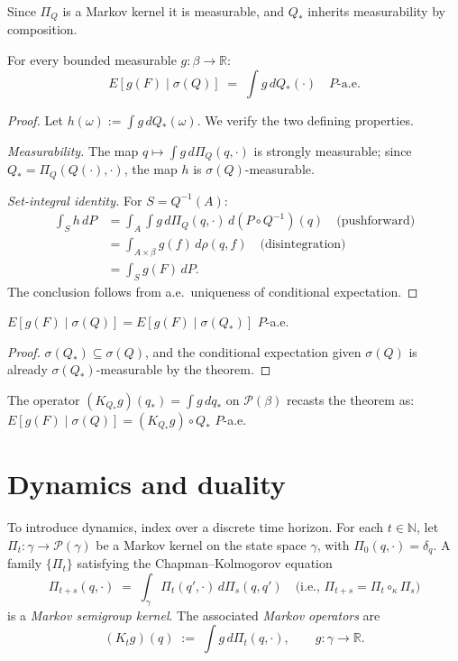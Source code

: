 Since $\Pi_Q$ is a Markov kernel it is measurable, and $Q_*$ inherits
measurability by composition.

\begin{theorem}
\label{thm:predictive-factorization}
For every bounded measurable $g : \beta \to \mathbb{R}$:
\[
  E[g(F) \mid \sigma(Q)] \;=\; \int g\, dQ_*(\cdot)
  \quad P\text{-a.e.}
\]
\end{theorem}
\begin{proof}
Let $h(\omega) := \int g\, dQ_*(\omega)$.  We verify the two defining properties.

\emph{Measurability.}  The map $q \mapsto \int g\, d\Pi_Q(q, \cdot)$ is
strongly measurable; since $Q_* = \Pi_Q(Q(\cdot), \cdot)$, the map $h$ is
$\sigma(Q)$-measurable.

\emph{Set-integral identity.}  For $S = Q^{-1}(A)$:
\begin{align*}
  \int_S h\, dP
  &= \int_A \int g\, d\Pi_Q(q, \cdot)\, d(P \circ Q^{-1})(q)
  \quad\text{(pushforward)} \\
  &= \int_{A \times \beta} g(f)\, d\rho(q, f)
  \quad\text{(disintegration)} \\
  &= \int_S g(F)\, dP.
\end{align*}
The conclusion follows from a.e.\ uniqueness of conditional expectation.
\end{proof}

\begin{corollary}
\label{cor:sufficiency}
$E[g(F) \mid \sigma(Q)] = E[g(F) \mid \sigma(Q_*)]$ $P$-a.e.
\end{corollary}
\begin{proof}
$\sigma(Q_*) \subseteq \sigma(Q)$, and the conditional expectation given
$\sigma(Q)$ is already $\sigma(Q_*)$-measurable by the theorem.
\end{proof}

The operator $(K_{Q_*} g)(q_*) = \int g\, dq_*$ on $\mathcal{P}(\beta)$
recasts the theorem as: $E[g(F) \mid \sigma(Q)] = (K_{Q_*} g) \circ Q_*$
$P$-a.e.

\section{Dynamics and duality}

To introduce dynamics, index over a discrete time horizon.  For each
$t \in \mathbb{N}$, let $\Pi_t : \gamma \to \mathcal{P}(\gamma)$ be a Markov
kernel on the state space $\gamma$, with $\Pi_0(q, \cdot) = \delta_q$.
A family $\{\Pi_t\}$ satisfying the Chapman--Kolmogorov equation
\[
  \Pi_{t+s}(q, \cdot) \;=\; \int_\gamma \Pi_t(q', \cdot)\, d\Pi_s(q, q')
  \quad\text{(i.e., } \Pi_{t+s} = \Pi_t \circ_\kappa \Pi_s\text{)}
\]
is a \emph{Markov semigroup kernel}.  The associated \emph{Markov operators}
are
\[
  (K_t g)(q) \;:=\; \int g\, d\Pi_t(q, \cdot), \qquad g : \gamma \to \mathbb{R}.
\]

